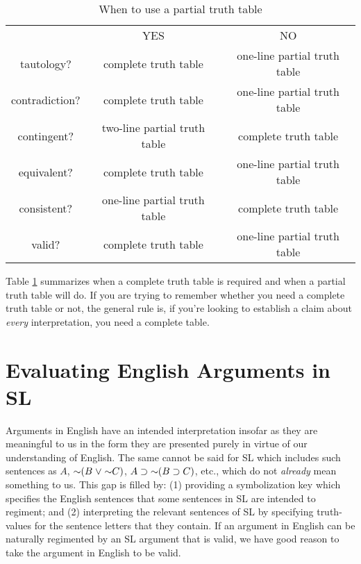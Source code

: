 \begin{table}[ht]
\begin{center}
\begin{tabular}{c|c|c|}
\cline{2-3}
 & YES & NO\\
\cline{2-3}
tautology? & complete truth table & one-line partial truth table\\
contradiction? &  complete truth table  & one-line partial truth table\\
contingent? & two-line partial truth table & complete truth table\\
equivalent? & complete truth table & one-line partial truth table\\
consistent? & one-line partial truth table & complete truth table\\
valid? & complete truth table & one-line partial truth table\\
\cline{2-3}
\end{tabular}
\end{center}
\caption{When to use a partial truth table}
\label{table.CompleteVsPartial}
\end{table}

Table \ref{table.CompleteVsPartial} summarizes when a complete truth table is required and when a partial truth table will do.
If you are trying to remember whether you need a complete truth table or not, the general rule is, if you're looking to establish a claim about \emph{every} interpretation, you need a complete table.




\section{Evaluating English Arguments in SL}
  \label{sec:forms}

Arguments in English have an intended interpretation insofar as they are meaningful to us in the form they are presented purely in virtue of our understanding of English.
The same cannot be said for SL which includes such sentences as $A$, $\enot (B \eor \enot C)$, $A \eif \enot (B \eif C)$, etc., which do not \textit{already} mean something to us.
This gap is filled by: (1) providing a symbolization key which specifies the English sentences that some sentences in SL are intended to regiment; and (2) interpreting the relevant sentences of SL by specifying truth-values for the sentence letters that they contain.
If an argument in English can be naturally regimented by an SL argument that is valid, we have good reason to take the argument in English to be valid.

